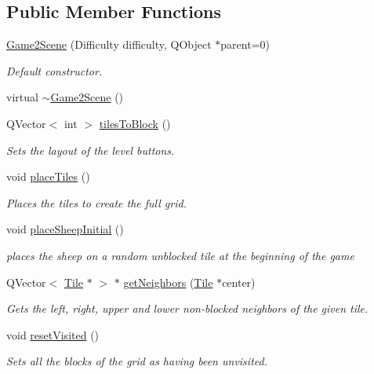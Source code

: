 \subsection*{\-Public \-Member \-Functions}
\begin{DoxyCompactItemize}
\item 
\hyperlink{classGame2Scene_a83cec7f9dd9883b6f33846af1fdda44d}{\-Game2\-Scene} (\-Difficulty difficulty, \-Q\-Object $\ast$parent=0)
\begin{DoxyCompactList}\small\item\em \-Default constructor. \end{DoxyCompactList}\item 
virtual \hyperlink{classGame2Scene_afb89d017cdab6ebf2c7224803fb88d2b}{$\sim$\-Game2\-Scene} ()
\item 
\-Q\-Vector$<$ int $>$ \hyperlink{classGame2Scene_a9b9cb03a70be505cdddbf41f4ca756b3}{tiles\-To\-Block} ()
\begin{DoxyCompactList}\small\item\em \-Sets the layout of the level buttons. \end{DoxyCompactList}\item 
void \hyperlink{classGame2Scene_a0d6f721674317295a05aa8754d0bd5ea}{place\-Tiles} ()
\begin{DoxyCompactList}\small\item\em \-Places the tiles to create the full grid. \end{DoxyCompactList}\item 
void \hyperlink{classGame2Scene_a562bffb8b3f851df83bafd4aa006db5e}{place\-Sheep\-Initial} ()
\begin{DoxyCompactList}\small\item\em places the sheep on a random unblocked tile at the beginning of the game \end{DoxyCompactList}\item 
\-Q\-Vector$<$ \hyperlink{classTile}{\-Tile} $\ast$ $>$ $\ast$ \hyperlink{classGame2Scene_acd18cc2afd6f91be8fdd083c92ca100b}{get\-Neighbors} (\hyperlink{classTile}{\-Tile} $\ast$center)
\begin{DoxyCompactList}\small\item\em \-Gets the left, right, upper and lower non-\/blocked neighbors of the given tile. \end{DoxyCompactList}\item 
void \hyperlink{classGame2Scene_a898d10c9a3030265ab2352ec5e914706}{reset\-Visited} ()
\begin{DoxyCompactList}\small\item\em \-Sets all the blocks of the grid as having been unvisited. \end{DoxyCompactList}\item 

\end{DoxyCompactItemize}
